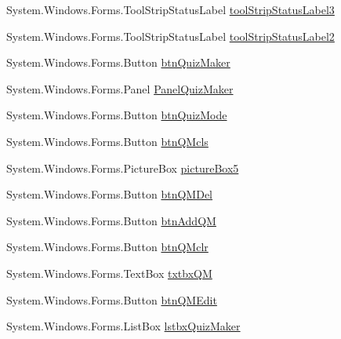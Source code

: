\begin{DoxyCompactItemize}
\item 
\-System.\-Windows.\-Forms.\-Tool\-Strip\-Status\-Label \hyperlink{class_sr_p___classroom_inq_1_1frm_classrrom_inq_a24d465fc0b54799fb86003278ae1e0c7}{tool\-Strip\-Status\-Label3}
\item 
\-System.\-Windows.\-Forms.\-Tool\-Strip\-Status\-Label \hyperlink{class_sr_p___classroom_inq_1_1frm_classrrom_inq_a453e5015dbeaefcb4cab17266e8db6ad}{tool\-Strip\-Status\-Label2}
\item 
\-System.\-Windows.\-Forms.\-Button \hyperlink{class_sr_p___classroom_inq_1_1frm_classrrom_inq_a521d725b634462f428d792ca3db59e2e}{btn\-Quiz\-Maker}
\item 
\-System.\-Windows.\-Forms.\-Panel \hyperlink{class_sr_p___classroom_inq_1_1frm_classrrom_inq_a1dd9af4cd0caad174e59e9038dcb8868}{\-Panel\-Quiz\-Maker}
\item 
\-System.\-Windows.\-Forms.\-Button \hyperlink{class_sr_p___classroom_inq_1_1frm_classrrom_inq_aed01a9041d00e0bef6cd7661bc9507d6}{btn\-Quiz\-Mode}
\item 
\-System.\-Windows.\-Forms.\-Button \hyperlink{class_sr_p___classroom_inq_1_1frm_classrrom_inq_a5e5ac9d18be5dce770d85fe95daa6801}{btn\-Q\-Mcls}
\item 
\-System.\-Windows.\-Forms.\-Picture\-Box \hyperlink{class_sr_p___classroom_inq_1_1frm_classrrom_inq_a1b73086b2cde9f44d3e6dfe20e17efbf}{picture\-Box5}
\item 
\-System.\-Windows.\-Forms.\-Button \hyperlink{class_sr_p___classroom_inq_1_1frm_classrrom_inq_a607596e2d684359b9534981170093cce}{btn\-Q\-M\-Del}
\item 
\-System.\-Windows.\-Forms.\-Button \hyperlink{class_sr_p___classroom_inq_1_1frm_classrrom_inq_adda77c1d58e5db64040dff4228e6d97e}{btn\-Add\-Q\-M}
\item 
\-System.\-Windows.\-Forms.\-Button \hyperlink{class_sr_p___classroom_inq_1_1frm_classrrom_inq_a07b511c8a2d041cab8551a9b7b9a65de}{btn\-Q\-Mclr}
\item 
\-System.\-Windows.\-Forms.\-Text\-Box \hyperlink{class_sr_p___classroom_inq_1_1frm_classrrom_inq_a4a85095c6aa75b21689e40d7dc78ace6}{txtbx\-Q\-M}
\item 
\-System.\-Windows.\-Forms.\-Button \hyperlink{class_sr_p___classroom_inq_1_1frm_classrrom_inq_ab86f3e7a592038c27499e00ec0a7fb3b}{btn\-Q\-M\-Edit}
\item 
\-System.\-Windows.\-Forms.\-List\-Box \hyperlink{class_sr_p___classroom_inq_1_1frm_classrrom_inq_af2496f0a0579263d9def95bd23d29c89}{lstbx\-Quiz\-Maker}
\item 

\end{DoxyCompactItemize}
